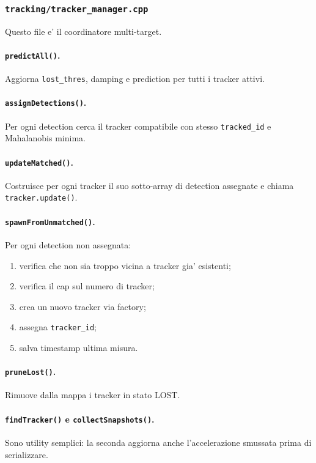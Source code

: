 \documentclass[11pt,a4paper]{article}
\newcommand{\code}[1]{\texttt{#1}}
\begin{document}
\subsubsection{\code{tracking/tracker\_manager.cpp}}

Questo file e' il coordinatore multi-target.

\paragraph{\code{predictAll()}.}
Aggiorna \code{lost\_thres}, damping e prediction per tutti i tracker attivi.

\paragraph{\code{assignDetections()}.}
Per ogni detection cerca il tracker compatibile con stesso \code{tracked\_id} e Mahalanobis minima.

\paragraph{\code{updateMatched()}.}
Costruisce per ogni tracker il suo sotto-array di detection assegnate e chiama \code{tracker.update()}.

\paragraph{\code{spawnFromUnmatched()}.}
Per ogni detection non assegnata:
\begin{enumerate}[leftmargin=1.4em]
  \item verifica che non sia troppo vicina a tracker gia' esistenti;
  \item verifica il cap sul numero di tracker;
  \item crea un nuovo tracker via factory;
  \item assegna \code{tracker\_id};
  \item salva timestamp ultima misura.
\end{enumerate}

\paragraph{\code{pruneLost()}.}
Rimuove dalla mappa i tracker in stato LOST.

\paragraph{\code{findTracker()} e \code{collectSnapshots()}.}
Sono utility semplici: la seconda aggiorna anche l'accelerazione smussata prima di serializzare.
\end{document}
